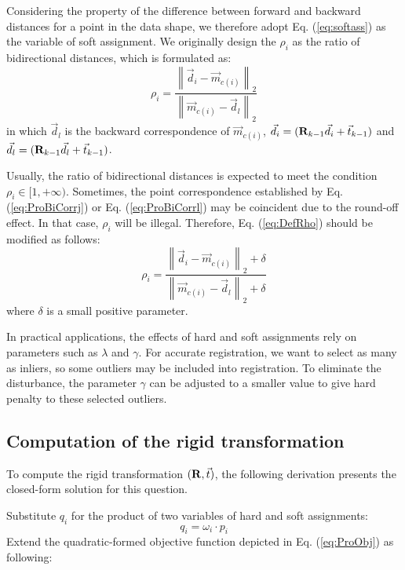 \documentclass[review]{elsarticle}
\begin{document}
Considering the property of the difference between forward and backward distances for a point in the data shape, we therefore adopt Eq. (\ref{eq:softass}) as the variable of soft assignment. We originally design the ${\rho _i}$ as the ratio of bidirectional distances, which is formulated as:
\begin{equation}
{{\rho _i} = \frac{{{{\left\| {{{\vec d }_i} - {{\vec m }_{c(i)}}} \right\|}_2}}}{{{{\left\| {{{\vec m }_{c(i)}} - {{\vec d }_l}} \right\|}_2}}}}
\label{eq:DefRho}
\end{equation}
in which ${\vec d _l}$ is the backward correspondence of ${\vec m _{c(i)}}$, ${\vec d _i} = ({{\bf{R}}_{k - 1}}{\vec d _i} + {\vec t _{k - 1}})$ and ${\vec d _l} = ({{\bf{R}}_{k - 1}}{\vec d _l} + {\vec t _{k - 1}})$.

Usually, the ratio of bidirectional distances is expected to meet the condition ${\rho _i} \in [1, + \infty )$. Sometimes, the point correspondence established by Eq. (\ref{eq:ProBiCorrj}) or Eq. (\ref{eq:ProBiCorrl}) may be coincident due to the round-off effect. In that case, ${\rho _i}$ will be illegal. Therefore, Eq. (\ref{eq:DefRho}) should be modified as follows:
\begin{equation}
{{\rho _i} = \frac{{{{\left\| {{{\vec d }_i} - {{\vec m }_{c(i)}}} \right\|}_2} + \delta }}{{{{\left\| {{{\vec m }_{c(i)}} - {{\vec d }_l}} \right\|}_2} + \delta }}}
\label{eq:ModiDefRho}
\end{equation}
where $\delta $ is a small positive parameter.

In practical applications, the effects of hard and soft assignments rely on parameters such as $\lambda $ and $\gamma$. For accurate registration, we want to select as many as inliers, so some outliers may be included into registration. To eliminate the disturbance, the parameter $\gamma$ can be adjusted to a smaller value to give hard penalty to these selected outliers.

\subsection{Computation of the rigid transformation}
To compute the rigid transformation $({\bf{R}},\vec t)$, the following derivation presents the closed-form solution for this question.

Substitute ${q_i}$ for the product of two variables of hard and soft assignments:
\begin{equation}
{{q_i} = {\omega _i} \cdot {p_i}}
\label{eq:SubstiMul}
\end{equation}
Extend the quadratic-formed objective function depicted in Eq. (\ref{eq:ProObj}) as following:
\end{document}
